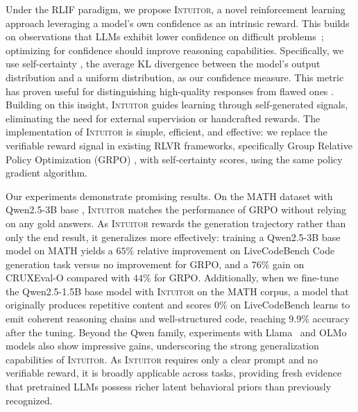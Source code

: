 \documentclass{article} %
\newcommand{\methodname}{\textsc{Intuitor}\xspace}
\begin{document}
Under the RLIF paradigm, we propose \methodname, a novel reinforcement learning approach leveraging a model's own confidence as an intrinsic reward. This builds on observations that LLMs exhibit lower confidence on difficult problems~\citep{farquhar2024detecting, kuhn2023semantic, kang2024unfamiliar, kang2025scalable}; optimizing for confidence should improve reasoning capabilities. Specifically, we use self-certainty \citep{kang2025scalable}, the average KL divergence between the model's output distribution and a uniform distribution, as our confidence measure. This metric has proven useful for distinguishing high-quality responses from flawed ones \citep{kang2025scalable, ma2025reasoning}. Building on this insight, \methodname guides learning through self-generated signals, eliminating the need for external supervision or handcrafted rewards. The implementation of \methodname is simple, efficient, and effective: we replace the verifiable reward signal in existing RLVR frameworks, specifically Group Relative Policy Optimization (GRPO) \citep{shao2024deepseekmath}, with self-certainty scores, using the same policy gradient algorithm.

Our experiments demonstrate promising results. On the MATH dataset \citep{hendrycks2021measuring} with Qwen2.5-3B base \citep{qwen2.5}, \methodname matches the performance of GRPO without relying on any gold answers. As \methodname rewards the generation trajectory rather than only the end result, it generalizes more effectively: training a Qwen2.5-3B base model on MATH yields a \(65\%\) relative improvement on LiveCodeBench Code generation task \citep{jain2024livecodebench} versus no improvement for GRPO, and a \(76 \%\) gain on CRUXEval-O \citep{gu2024cruxeval} compared with \(44 \%\) for GRPO. Additionally, when we fine-tune the Qwen2.5-1.5B base model with \methodname on the MATH corpus, a model that originally produces repetitive content and scores \(0\%\) on LiveCodeBench learns to emit coherent reasoning chains and well-structured code, reaching \(9.9\%\) accuracy after the tuning. Beyond the Qwen family, experiments with Llama~\citep{meta2024llama3} and OLMo~\citep{olmo20242olmo2furious} models also show impressive gains, underscoring the strong generalization capabilities of \methodname. As \methodname requires only a clear prompt and no verifiable reward, it is broadly applicable across tasks, providing fresh evidence that pretrained LLMs possess richer latent behavioral priors than previously recognized. 
\end{document}

